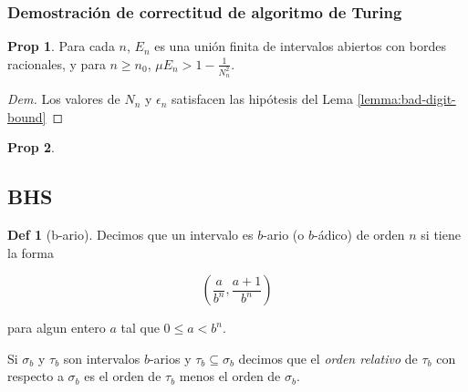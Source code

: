 \documentclass{report}
\theoremstyle{definition} %
\newtheorem*{proposition*}{Prop}
\newtheorem*{definition*}{Def}
\begin{document}
\subsubsection{Demostración de correctitud de algoritmo de Turing}

\begin{proposition*}
    Para cada $n$, $E_n$ es una unión finita de intervalos abiertos con bordes
    racionales, y para $n \geq n_0$, $\mu E_n > 1 - \frac{1}{N^2_n}$.
\end{proposition*}
\begin{proof}[Dem]
    Los valores de $N_n$ y $\epsilon_n$ satisfacen las hipótesis del Lema
    \ref{lemma:bad-digit-bound}
\end{proof}

\begin{proposition*}
    
\end{proposition*}

\subsection{BHS}

\begin{definition*}[b-ario]
    Decimos que un intervalo es $b$-ario (o $b$-ádico) de orden $n$ si tiene la
    forma

    \[
        \left(\frac{a}{b^n}, \frac{a+1}{b^n}\right)
    \]

    para algun entero $a$ tal que $0 \leq a < b^n$.

    Si $\sigma_b$ y $\tau_b$ son intervalos $b$-arios y $\tau_b \subseteq
    \sigma_b$ decimos que el \textit{orden relativo} de $\tau_b$ con respecto a
    $\sigma_b$ es el orden de $\tau_b$ menos el orden de $\sigma_b$.
\end{definition*}
\end{document}
